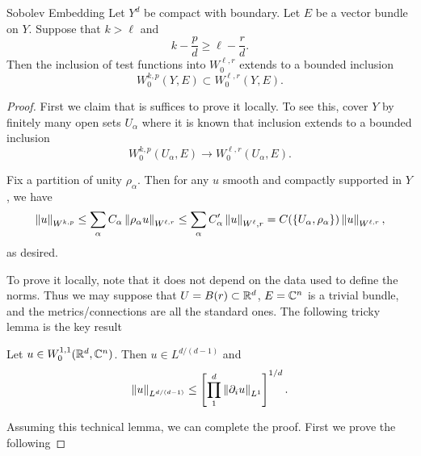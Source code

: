 \documentclass{amsart}
\begin{document}
\begin{clear}{Sobolev Embedding}
  Let $Y^{d}$ be compact with boundary. Let $E$ be a vector bundle on $Y$. Suppose that $k>\ell$ and
  \begin{equation*}
    k-\frac{p}{d}\ge \ell-\frac{r}{d}.
  \end{equation*}
  Then the inclusion of test functions into $W^{\ell,r}_{0}$ extends to a bounded inclusion
  \begin{equation*}
    W^{k,p}_{0}(Y,E)\subset W^{\ell,r}_{0}(Y,E).
  \end{equation*}
\end{clear}
\begin{proof}
  First we claim that is suffices to prove it locally. To see this, cover $Y$ by finitely many open sets $U_{\alpha}$ where it is known that inclusion extends to a bounded inclusion $$W^{k,p}_{0}(U_{\alpha},E)\to W^{\ell,r}_{0}(U_{\alpha},E).$$

  Fix a partition of unity $\rho_{\alpha}$. Then for any $u$ smooth and compactly supported in $Y$, we have
  \begin{equation*}
    \left\lVert u\right\rVert_{W^{k,p}}\le \sum_{\alpha} C_{\alpha}\left\lVert\rho_{\alpha}u\right\rVert_{W^{\ell,r}}\le \sum_{\alpha}C_{\alpha}'\left\lVert u\right\rVert_{W^{\ell},r}=C(\left\{U_{\alpha},\rho_{\alpha}\right\})\left\lVert u\right\rVert_{W^{\ell,r}},
  \end{equation*}
  as desired.

  To prove it locally, note that it does not depend on the data used to define the norms. Thus we may suppose that $U=B(r)\subset \mathbb{R}^{d}$, $E=\mathbb{C}^{n}$ is a trivial bundle, and the metrics/connections are all the standard ones. The following tricky lemma is the key result
  \begin{lemma}
    Let $u\in W^{1,1}_{0}(\mathbb{R}^{d},\mathbb{C}^{n})$. Then $u\in L^{d/(d-1)}$ and
    \begin{equation*}
      \left\lVert u\right\rVert_{L^{d/(d-1)}}\le \left[\prod_{1}^{d}\left\lVert\partial_{i}u\right\rVert_{L^{1}}\right]^{1/d}.
    \end{equation*}
  \end{lemma}
  Assuming this technical lemma, we can complete the proof. First we prove the following


\end{proof}
\end{document}

